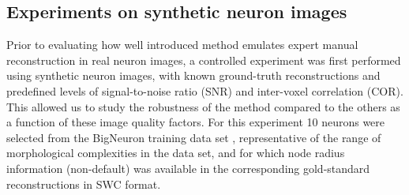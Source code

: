 \subsection{Experiments on synthetic neuron images}
\label{subsec:eval-sim}
Prior to evaluating how well introduced method emulates expert manual reconstruction in real neuron images, a controlled experiment was first performed using synthetic neuron images, with known ground-truth reconstructions and predefined levels of signal-to-noise ratio (SNR) and inter-voxel correlation (COR). This allowed us to study the robustness of the method compared to the others as a function of these image quality factors. For this experiment 10 neurons were selected from the BigNeuron training data set \cite{peng2015bigneuron}, representative of the range of morphological complexities in the data set, and for which node radius information (non-default) was available in the corresponding gold-standard reconstructions in SWC format.
